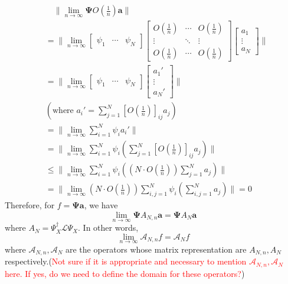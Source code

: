 \documentclass{article}[11]
\begin{document}
	\begin{align*}
		&\quad \|\lim_{n\to\infty} \mathbf{\Psi}O(\tfrac{1}{n})\mathbf{a}\| \\
		&= \|\lim_{n\to\infty} 
		\begin{bmatrix}
			\psi_1 & \cdots & \psi_N
		\end{bmatrix}
		\begin{bmatrix}
			O(\tfrac{1}{n}) & \cdots & O(\tfrac{1}{n}) \\
			\vdots & \ddots & \vdots \\
			O(\tfrac{1}{n}) & \cdots & O(\tfrac{1}{n})
		\end{bmatrix}
		\begin{bmatrix}
			a_1 \\
			\vdots \\
			a_N
		\end{bmatrix} \| \\
		&= \|\lim_{n\to\infty} 
		\begin{bmatrix}
			\psi_1 & \cdots & \psi_N
		\end{bmatrix}
		\begin{bmatrix}
			a_1' \\
			\vdots \\
			a_N'
		\end{bmatrix} \| \\
		&(\text{where $a_i'=\sum_{j=1}^N [O(\tfrac{1}{n})]_{ij}a_j$}) \\
		&= \|\lim_{n\to\infty} \sum_{i=1}^N \psi_i a_i' \| \\
		&= \|\lim_{n\to\infty} \sum_{i=1}^N \psi_i \left( \sum_{j=1}^N [O(\tfrac{1}{n})]_{ij}a_j \right) \| \\
		&\leq \|\lim_{n\to\infty} \sum_{i=1}^N \psi_i \left( \left(N \cdot O(\tfrac{1}{n})\right) \sum_{j=1}^N a_j \right) \| \\
		&= \|\lim_{n\to\infty} \left(N \cdot O(\tfrac{1}{n})\right) \sum_{i,j=1}^N \psi_i \left( \sum_{i,j=1}^N a_j \right) \| = 0
	\end{align*}
	Therefore, for $f=\mathbf{\Psi}\mathbf{a}$, we have
	$$\lim_{n\to\infty} \mathbf{\Psi}A_{N,n} \mathbf{a} = \mathbf{\Psi}A_N \mathbf{a}$$ 
	where $A_N = \Psi_X^{\dagger}\mathcal{L}\Psi_X$. In other words,
	$$
	\lim_{n\to\infty} \mathcal{A}_{N,n} f = \mathcal{A}_N f
	$$
	where $\mathcal{A}_{N,n}, \mathcal{A}_N$ are the operators whose matrix representation are $A_{N,n}, A_N$ respectively.(\textcolor{red}{Not sure if it is appropriate and necessary to mention $\mathcal{A}_{N,n}, \mathcal{A}_N$ here. If yes, do we need to define the domain for these operators?})
	
\end{document}
